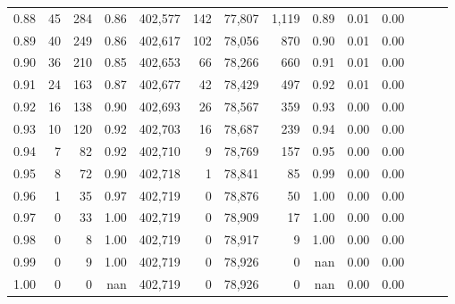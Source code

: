 \begin{tabular}{rrrrrrrrrrrrrr}
0.88 &      45 &    284 &  0.86 &  402,577 &      142 &  77,807 &   1,119 &  0.89 &  0.01 &      0.00 \\
0.89 &      40 &    249 &  0.86 &  402,617 &      102 &  78,056 &     870 &  0.90 &  0.01 &      0.00 \\
0.90 &      36 &    210 &  0.85 &  402,653 &       66 &  78,266 &     660 &  0.91 &  0.01 &      0.00 \\
0.91 &      24 &    163 &  0.87 &  402,677 &       42 &  78,429 &     497 &  0.92 &  0.01 &      0.00 \\
0.92 &      16 &    138 &  0.90 &  402,693 &       26 &  78,567 &     359 &  0.93 &  0.00 &      0.00 \\
0.93 &      10 &    120 &  0.92 &  402,703 &       16 &  78,687 &     239 &  0.94 &  0.00 &      0.00 \\
0.94 &       7 &     82 &  0.92 &  402,710 &        9 &  78,769 &     157 &  0.95 &  0.00 &      0.00 \\
0.95 &       8 &     72 &  0.90 &  402,718 &        1 &  78,841 &      85 &  0.99 &  0.00 &      0.00 \\
0.96 &       1 &     35 &  0.97 &  402,719 &        0 &  78,876 &      50 &  1.00 &  0.00 &      0.00 \\
0.97 &       0 &     33 &  1.00 &  402,719 &        0 &  78,909 &      17 &  1.00 &  0.00 &      0.00 \\
0.98 &       0 &      8 &  1.00 &  402,719 &        0 &  78,917 &       9 &  1.00 &  0.00 &      0.00 \\
0.99 &       0 &      9 &  1.00 &  402,719 &        0 &  78,926 &       0 &   nan &  0.00 &      0.00 \\
1.00 &       0 &      0 &   nan &  402,719 &        0 &  78,926 &       0 &   nan &  0.00 &      0.00 \\
\bottomrule
\end{tabular}
